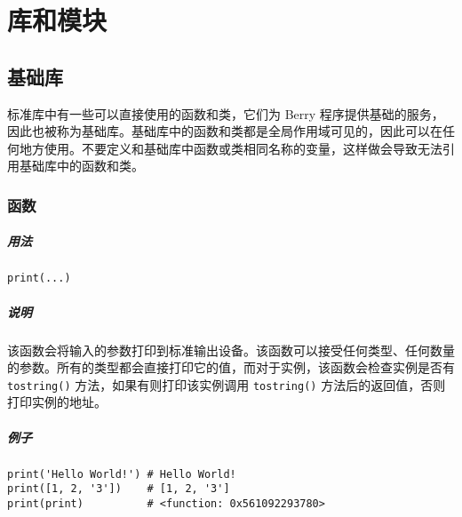 \chapter{库和模块}

\section{基础库}

标准库中有一些可以直接使用的函数和类，它们为 Berry 程序提供基础的服务，因此也被称为基础库。基础库中的函数和类都是全局作用域可见的，因此可以在任何地方使用。不要定义和基础库中函数或类相同名称的变量，这样做会导致无法引用基础库中的函数和类。

\subsection{函数}


\paragraph{用法}
\begin{lstlisting}[language=berry, numbers=none]
print(...)
\end{lstlisting}

\paragraph{说明}
该函数会将输入的参数打印到标准输出设备。该函数可以接受任何类型、任何数量的参数。所有的类型都会直接打印它的值，而对于实例，该函数会检查实例是否有 \texttt{tostring()} 方法，如果有则打印该实例调用 \texttt{tostring()} 方法后的返回值，否则打印实例的地址。

\paragraph{例子}
\begin{lstlisting}[language=berry, numbers=none]
print('Hello World!') # Hello World!
print([1, 2, '3'])    # [1, 2, '3']
print(print)          # <function: 0x561092293780>
\end{lstlisting}


